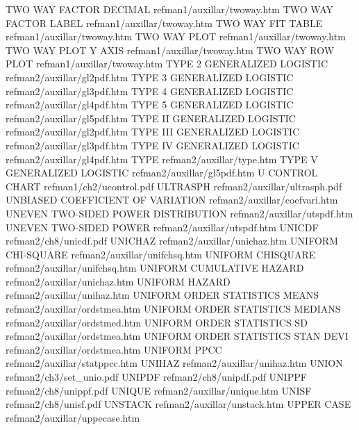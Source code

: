 TWO WAY FACTOR DECIMAL                  refman1/auxillar/twoway.htm
TWO WAY FACTOR LABEL                    refman1/auxillar/twoway.htm
TWO WAY FIT TABLE                       refman1/auxillar/twoway.htm
TWO WAY PLOT                            refman1/auxillar/twoway.htm
TWO WAY PLOT Y AXIS                     refman1/auxillar/twoway.htm
TWO WAY ROW PLOT                        refman1/auxillar/twoway.htm
TYPE 2 GENERALIZED LOGISTIC             refman2/auxillar/gl2pdf.htm
TYPE 3 GENERALIZED LOGISTIC             refman2/auxillar/gl3pdf.htm
TYPE 4 GENERALIZED LOGISTIC             refman2/auxillar/gl4pdf.htm
TYPE 5 GENERALIZED LOGISTIC             refman2/auxillar/gl5pdf.htm
TYPE II GENERALIZED LOGISTIC            refman2/auxillar/gl2pdf.htm
TYPE III GENERALIZED LOGISTIC           refman2/auxillar/gl3pdf.htm
TYPE IV GENERALIZED LOGISTIC            refman2/auxillar/gl4pdf.htm
TYPE                                    refman2/auxillar/type.htm
TYPE V GENERALIZED LOGISTIC             refman2/auxillar/gl5pdf.htm
U CONTROL CHART                         refman1/ch2/ucontrol.pdf
ULTRASPH                                refman2/auxillar/ultrasph.pdf
UNBIASED  COEFFICIENT OF VARIATION      refman2/auxillar/coefvari.htm
UNEVEN TWO-SIDED POWER DISTRIBUTION     refman2/auxillar/utspdf.htm
UNEVEN TWO-SIDED POWER                  refman2/auxillar/utspdf.htm
UNICDF                                  refman2/ch8/unicdf.pdf
UNICHAZ                                 refman2/auxillar/unichaz.htm
UNIFORM CHI-SQUARE                      refman2/auxillar/unifchsq.htm
UNIFORM CHISQUARE                       refman2/auxillar/unifchsq.htm
UNIFORM CUMULATIVE HAZARD               refman2/auxillar/unichaz.htm
UNIFORM HAZARD                          refman2/auxillar/unihaz.htm
UNIFORM ORDER STATISTICS MEANS          refman2/auxillar/ordstmea.htm
UNIFORM ORDER STATISTICS MEDIANS        refman2/auxillar/ordstmed.htm
UNIFORM ORDER STATISTICS SD             refman2/auxillar/ordstmea.htm
UNIFORM ORDER STATISTICS STAN DEVI      refman2/auxillar/ordstmea.htm
UNIFORM PPCC                            refman2/auxillar/statppcc.htm
UNIHAZ                                  refman2/auxillar/unihaz.htm
UNION                                   refman2/ch3/set_unio.pdf
UNIPDF                                  refman2/ch8/unipdf.pdf
UNIPPF                                  refman2/ch8/unippf.pdf
UNIQUE                                  refman2/auxillar/unique.htm
UNISF                                   refman2/ch8/unisf.pdf
UNSTACK                                 refman2/auxillar/unstack.htm
UPPER CASE                              refman2/auxillar/uppecase.htm
